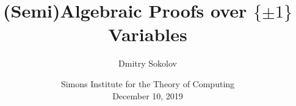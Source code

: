 

\titlegraphic{
    
}


\title[$\{\pm 1\}$ Variables]{
    (Semi)Algebraic Proofs over $\{\pm 1\}$ Variables
}

\author[Sokolov D.]{
    Dmitry Sokolov
}  


\date{Simons Institute for the Theory of Computing\\ December 10, 2019}





    \maketitle

    
    
    
    
    
    

